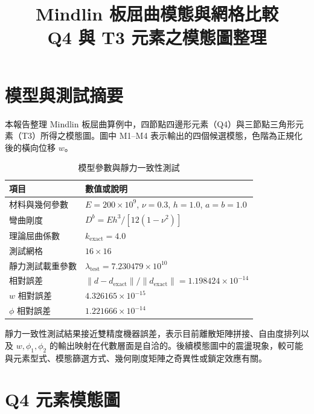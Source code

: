 \documentclass[11pt,a4paper]{article}
\title{\textbf{Mindlin 板屈曲模態與網格比較}\\[0.35em]
\large Q4 與 T3 元素之模態圖整理}
\author{}
\date{}
\begin{document}
\maketitle

\section{模型與測試摘要}

本報告整理 Mindlin 板屈曲算例中，四節點四邊形元素（Q4）與三節點三角形元素（T3）所得之模態圖。圖中 M1--M4 表示輸出的四個候選模態，色階為正規化後的橫向位移 $w$。

\begin{table}[H]
\centering
\caption{模型參數與靜力一致性測試}
\begin{tabular}{>{\raggedright\arraybackslash}p{}p{}}
\toprule
項目 & 數值或說明 \\
\midrule
材料與幾何參數 & $E=200\times 10^9$, $\nu=0.3$, $h=1.0$, $a=b=1.0$ \\
彎曲剛度 & $D^b = Eh^3/[12(1-\nu^2)]$ \\
理論屈曲係數 & $k_{\mathrm{exact}}=4.0$ \\
測試網格 & $16\times16$ \\
靜力測試載重參數 & $\lambda_{\mathrm{test}}=7.230479\times10^{10}$ \\
相對誤差 & $\|d-d_{\mathrm{exact}}\|/\|d_{\mathrm{exact}}\|=1.198424\times10^{-14}$ \\
$w$ 相對誤差 & $4.326165\times10^{-15}$ \\
$\phi$ 相對誤差 & $1.221666\times10^{-14}$ \\
\bottomrule
\end{tabular}
\end{table}

靜力一致性測試結果接近雙精度機器誤差，表示目前離散矩陣拼接、自由度排列以及 $w,\phi_1,\phi_2$ 的輸出映射在代數層面是自洽的。後續模態圖中的震盪現象，較可能與元素型式、模態篩選方式、幾何剛度矩陣之奇異性或鎖定效應有關。

\clearpage

\section{Q4 元素模態圖}
\end{document}
